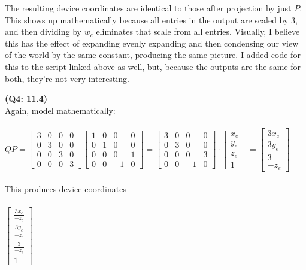 \documentclass[letterpaper, 11pt]{article}
\begin{document}
The resulting device coordinates are identical to those after projection by just $P$. This shows up mathematically because all entries in the output are scaled by $3$, and then dividing by $w_c$ eliminates that scale from all entries. Visually, I believe this has the effect of expanding evenly expanding and then condensing our view of the world by the same constant, producing the same picture. I added code for this to the script linked above as well, but, because the outputs are the same for both, they're not very interesting. 

\medskip
\textbf{(Q4: 11.4)} \\ 
Again, model mathematically: \\ \\ 
$QP = 
\begin{bmatrix}
3 & 0 & 0 & 0 \\
0 & 3 & 0 & 0 \\
0 & 0 & 3 & 0 \\
0 & 0 & 0 & 3
\end{bmatrix}
\begin{bmatrix}
1 & 0 & 0 & 0 \\
0 & 1 & 0 & 0 \\
0 & 0 & 0 & 1 \\
0 & 0 & -1 & 0
\end{bmatrix}
=
\begin{bmatrix}
3 & 0 & 0 & 0 \\
0 & 3 & 0 & 0 \\
0 & 0 & 0 & 3 \\
0 & 0 & -1 & 0
\end{bmatrix}
\cdot 
\begin{bmatrix}
x_e  \\
y_e  \\
z_e  \\
1 
\end{bmatrix}
=
\begin{bmatrix}
3x_e  \\
3y_e  \\
3  \\
-z_e 
\end{bmatrix}$ \\ \\

This produces device coordinates \\ \\ 
$\begin{bmatrix}
  \frac{3x_e}{-z_e} \\
  \frac{3y_e}{-z_e}  \\
  \frac{3}{-z_e}  \\
  1 
\end{bmatrix}$ \\ \\ 
\end{document}
